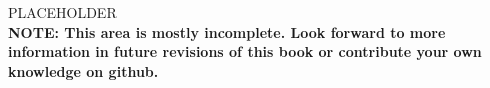 

\raggedcolumns
\begin{multicols}{2}
PLACEHOLDER\\

\textbf{NOTE: This area is mostly incomplete. Look forward to more information in future revisions of this book or contribute your own knowledge on github.}\\

\newpage
	
	
\end{multicols}
\clearpage